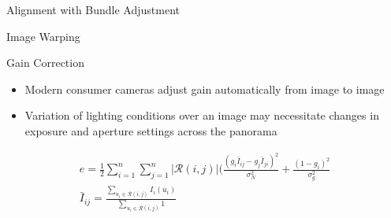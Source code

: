 \documentclass{beamer}
\begin{document}
\begin{frame}{Alignment with Bundle Adjustment}

\end{frame}

\begin{frame}{Image Warping}

\end{frame}

\begin{frame}{Gain Correction}
\begin{itemize}
	\item Modern consumer cameras adjust gain automatically from image to image
	\item Variation of lighting conditions over an image may necessitate changes in exposure and aperture settings across the panorama
\end{itemize}
\begin{align}
e = \frac{1}{2} \sum^n_{i=1} \sum^n_{j=1} |\mathcal{R}(i,j)| (\frac{(g_i \bar{I}_{ij} - g_j \bar{I}_{ji})^2}{\sigma_N^2} + \frac{(1-g_i)^2}{\sigma_g^2}\\
\bar{I}_{ij} = \frac{\sum_{u_i \in \mathcal{R}(i,j)} I_i(u_i)}{\sum_{u_i \in \mathcal{R}(i,j)} 1}
\end{align}

\end{frame}
\end{document}
